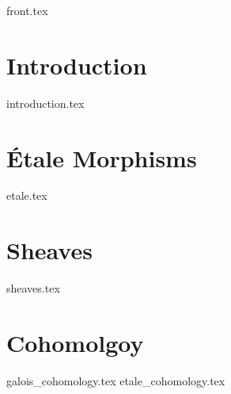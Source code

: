 \documentclass[11pt, openany]{memoir}
\title{}
\author{Kento Okura}
\begin{document}
\frontmatter
{front.tex}

\mainmatter

\chapter{Introduction}
{introduction.tex}

\chapter{\'Etale Morphisms}
{etale.tex}

\chapter{Sheaves}
{sheaves.tex}

\chapter{Cohomolgoy}
{galois_cohomology.tex}
{etale_cohomology.tex}



\end{document}
